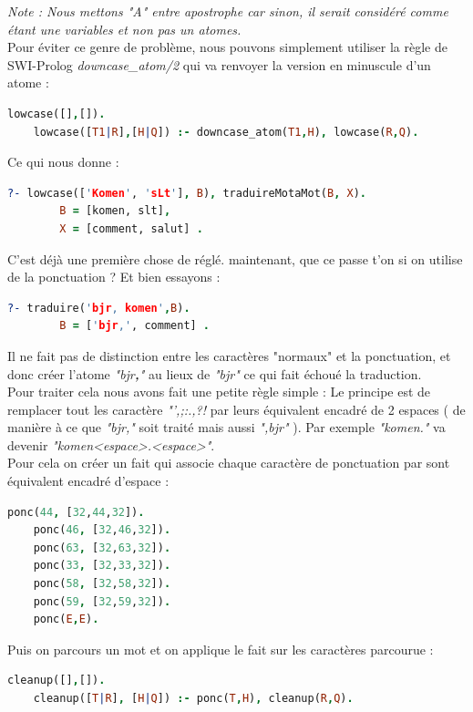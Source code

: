 \documentclass[11pt]{book}
\begin{document}
	{\em Note : Nous mettons "A" entre apostrophe car sinon, il serait considéré comme étant une variables et non pas un atomes.}\\
	
	Pour éviter ce genre de problème, nous pouvons simplement utiliser la règle de SWI-Prolog {\em downcase\_atom/2} qui va renvoyer la version en minuscule d'un atome :
	\begin{lstlisting}[language=Prolog]
	lowcase([],[]).
	lowcase([T1|R],[H|Q]) :- downcase_atom(T1,H), lowcase(R,Q).
	\end{lstlisting}
	
	Ce qui nous donne :
	\begin{lstlisting}[language=Prolog]
	?- lowcase(['Komen', 'sLt'], B), traduireMotaMot(B, X).
		B = [komen, slt],
		X = [comment, salut] .
	\end{lstlisting}
	
	C'est déjà une première chose de réglé. maintenant, que ce passe t'on si on utilise de la ponctuation ? Et bien essayons :
	\begin{lstlisting}[language=Prolog]
	?- traduire('bjr, komen',B).
		B = ['bjr,', comment] .
	\end{lstlisting}
	
	Il ne fait pas de distinction entre les caractères "normaux" et la ponctuation, et donc créer l'atome {\em "bjr\textbf{,}"} au lieux de {\em "bjr"} ce qui fait échoué la traduction.\\
	Pour traiter cela nous avons fait une petite règle simple : Le principe est de remplacer tout les caractère {\em "',;:.,?!} par leurs équivalent encadré de 2 espaces ( de manière à ce que {\em "bjr,"} soit traité mais aussi {\em ",bjr"} ). Par exemple {\em "komen."} va devenir {\em "komen<espace>.<espace>"}.\\
	Pour cela on créer un fait qui associe chaque caractère de ponctuation par sont équivalent encadré d'espace :
	\begin{lstlisting}[language=Prolog]
	ponc(44, [32,44,32]).
	ponc(46, [32,46,32]).
	ponc(63, [32,63,32]).
	ponc(33, [32,33,32]).
	ponc(58, [32,58,32]).
	ponc(59, [32,59,32]).
	ponc(E,E).
	\end{lstlisting}
	
	Puis on parcours un mot et on applique le fait sur les caractères parcourue :
	\begin{lstlisting}[language=Prolog]
	cleanup([],[]).
	cleanup([T|R], [H|Q]) :- ponc(T,H), cleanup(R,Q).
	\end{lstlisting}
	
\end{document}
